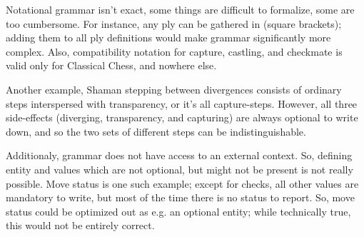 \clearpage %

Notational grammar isn't exact, some things are difficult to formalize, some
are too cumbersome. For instance, any ply can be gathered in \alg{[ ]} (square
brackets); adding them to all ply definitions would make grammar significantly
more complex. Also, compatibility notation for capture, castling, and checkmate
is valid only for Classical Chess, and nowhere else.

Another example, Shaman stepping between divergences consists of ordinary steps
interspersed with transparency, or it's all capture-steps. However, all three
side-effects (diverging, transparency, and capturing) are always optional to
write down, and so the two sets of different steps can be indistinguishable.

Additionaly, grammar does not have access to an external context. So, defining
entity and values which are not optional, but might not be present is not really
possible. Move status is one such example; except for checks, all other values
are mandatory to write, but most of the time there is no status to report. So,
move status could be optimized out as e.g. an optional entity; while technically
true, this would not be entirely correct.

\clearpage %
